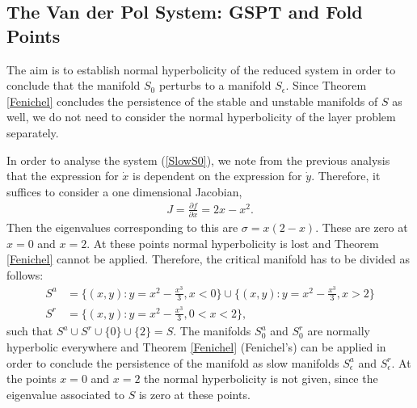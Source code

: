 \subsection{The Van der Pol System: GSPT and Fold Points }
The aim is to establish normal hyperbolicity of the reduced system in order to conclude that the manifold $S_0$ perturbs to a manifold $S_\epsilon$. Since Theorem \ref{Fenichel} concludes the persistence of the stable and unstable manifolds of $S$ as well, we do not need to consider the normal hyperbolicity of the layer problem separately. 

In order to analyse the system (\ref{SlowS0}), we note from the previous analysis that the expression for $\dot{x}$ is dependent on the expression for $\dot{y}$. Therefore, it suffices to consider a one dimensional Jacobian,
\begin{align*}
J= \frac{\partial f}{\partial x} = 2x - x^2.
\end{align*}
Then the eigenvalues corresponding to this are $\sigma = x(2-x)$. These are zero at $x=0$ and $x=2$. At these points normal hyperbolicity is lost and Theorem \ref{Fenichel} cannot be applied.
Therefore, the critical manifold has to be divided as follows:
\begin{align*}
S^a &=\bigg \lbrace (x,y): y = x^2-\frac{x^3}{3}, x< 0 \bigg \rbrace \cup \bigg \lbrace (x,y): y = x^2-\frac{x^3}{3}, x>2 \bigg\rbrace \\
S^r &= \bigg\lbrace (x,y): y = x^2-\frac{x^3}{3}, 0< x< 2 \bigg\rbrace,
\end{align*}
such that $S^a \cup S^r \cup \{0\} \cup \{2\} = S$.
The manifolds $S^a_0$ and $S^r_0$ are normally hyperbolic everywhere and  Theorem \ref{Fenichel} (Fenichel's) can be applied in order to conclude the persistence of the manifold as slow manifolds $S^a_\epsilon$ and $S^r_\epsilon$. At the points $x=0$ and $x=2$ the normal hyperbolicity is not given, since the eigenvalue associated to $S$ is zero at these points.

